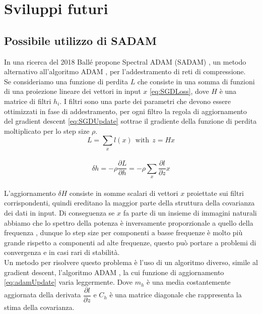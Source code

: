 \chapter{Sviluppi futuri}

\section{Possibile utilizzo di SADAM}

In una ricerca del 2018 Ballé propone Spectral ADAM (SADAM) \cite{balle2018efficient}, un metodo alternativo all’algoritmo ADAM \cite{kingma2014adam}, per l’addestramento di reti di compressione.\\
Se consideriamo una funzione di perdita $L$ che consiste in una somma di funzioni di una proiezione lineare dei vettori in input $x$ \ref{eq:SGDLoss}, dove $H$ è una matrice di filtri $h_{i}$. I filtri sono una parte dei parametri che devono essere ottimizzati in fase di addestramento, per ogni filtro la regola di aggiornamento del gradient descent \ref{eq:SGDUpdate} sottrae il gradiente della funzione di perdita moltiplicato per lo step size $\rho$.\\
\begin{equation}\label{eq:SGDLoss}
L = \sum_{x} l(x) \:\: \textrm{with} \:\: z = Hx
\end{equation}\\
\begin{equation}\label{eq:SGDUpdate}
\delta h = - \rho \dfrac{\partial L}{\partial h} = - \rho \sum_{x} \dfrac{\partial l}{\partial z} x
\end{equation}\\
L’aggiornamento $\delta H$ consiste in somme scalari di vettori $x$ proiettate sui filtri corrispondenti, quindi ereditano la maggior parte della struttura della covarianza dei dati in input. Di conseguenza se $x$ fa parte di un insieme di immagini naturali abbiamo che lo spettro della potenza è inversamente proporzionale a quello della frequenza \cite{field1987relations}, dunque lo step size per componenti a basse frequenze è molto più grande rispetto a componenti ad alte frequenze, questo può portare a problemi di convergenza e in casi rari di stabilità.\\
Un metodo per risolvere questo problema è l’uso di un algoritmo diverso, simile al gradient descent, l’algoritmo ADAM \cite{kingma2014adam}, la cui funzione di aggiornamento \ref{eq:adamUpdate} varia leggermente. Dove $m_{h}$ è una media costantemente aggiornata della derivata $\dfrac{\partial l}{\partial z}$ e $C_{h}$ è una matrice diagonale che rappresenta la stima della covarianza.\\
